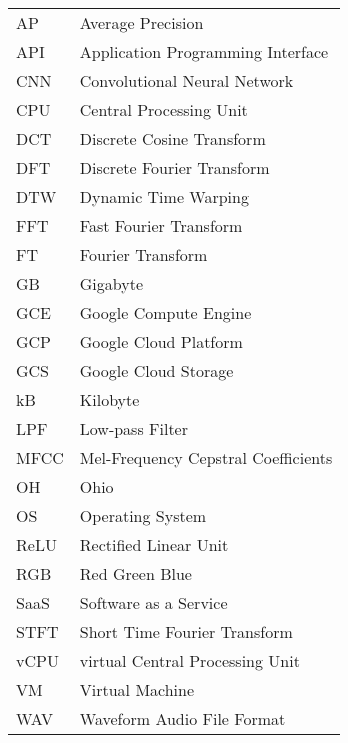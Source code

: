 \begingroup
\renewcommand{\arraystretch}{1.2}
\begin{tabular}{@{}p{2.5cm} l}
    AP	 &	Average Precision	\\
    API	 &	Application Programming Interface	\\
    CNN	 &	Convolutional Neural Network	\\
    CPU	 &	Central Processing Unit	\\
    DCT	 &	Discrete Cosine Transform	\\
    DFT	 &	Discrete Fourier Transform	\\
    DTW	 &	Dynamic Time Warping	\\
    FFT	 &	Fast Fourier Transform	\\
    FT	 &	Fourier Transform	\\
    GB	 &	Gigabyte	\\
    GCE	 &	Google Compute Engine	\\
    GCP	 &	Google Cloud Platform	\\
    GCS	 &	Google Cloud Storage	\\
    kB	 &	Kilobyte	\\
    LPF	 &	Low-pass Filter	\\
    MFCC &	Mel-Frequency Cepstral Coefficients	\\
    OH	 &	Ohio	\\
    OS	 &	Operating System	\\
    ReLU &  Rectified Linear Unit \\
    RGB	 &	Red Green Blue	\\
    SaaS &	Software as a Service	\\
    STFT &	Short Time Fourier Transform	\\
    vCPU &	virtual Central Processing Unit	\\
    VM	 &	Virtual Machine	\\
    WAV	 &	Waveform Audio File Format	\\
\end{tabular}
\endgroup
